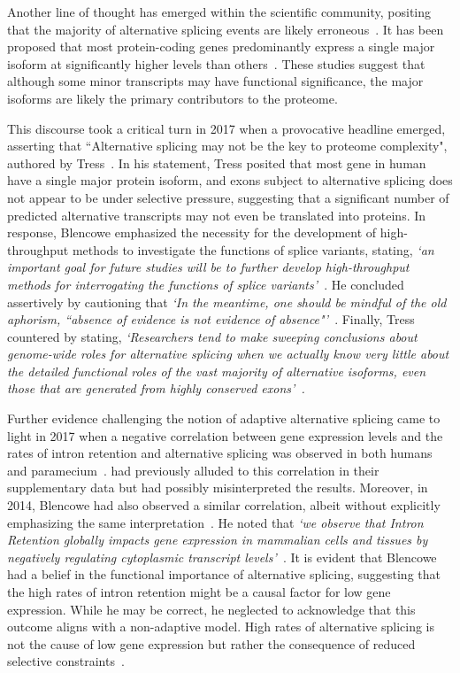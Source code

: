 Another line of thought has emerged within the scientific community, positing that the majority of alternative splicing events are likely erroneous~\citep{pickrell_noisy_2010, leoni_coding_2011}. It has been proposed that most protein-coding genes predominantly express a single major isoform at significantly higher levels than others~\citep{gonzalez-porta_transcriptome_2013, tress_most_2017}. These studies suggest that although some minor transcripts may have functional significance, the major isoforms are likely the primary contributors to the proteome.

This discourse took a critical turn in 2017 when a provocative headline emerged, asserting that “Alternative splicing may not be the key to proteome complexity", authored by Tress~\citep{tress_alternative_2017}. In his statement, Tress posited that most gene in human have a single major protein isoform, and exons subject to alternative splicing does not appear to be under selective pressure, suggesting that a significant number of predicted alternative transcripts may not even be translated into proteins. In response, Blencowe emphasized the necessity for the development of high-throughput methods to investigate the functions of splice variants, stating, \textit{`an important goal for future studies will be to further develop high-throughput methods for interrogating the functions of splice variants'~\citep{blencowe_relationship_2017}}. He concluded assertively by cautioning that \textit{`In the meantime, one should be mindful of the old aphorism, “absence of evidence is not evidence of absence"'~\citep{blencowe_relationship_2017}}. Finally, Tress countered by stating, \textit{`Researchers tend to make sweeping conclusions about genome-wide roles for alternative splicing when we actually know very little about the detailed functional roles of the vast majority of alternative isoforms, even those that are generated from highly conserved exons'~\citep{tress_most_2017}.}

Further evidence challenging the notion of adaptive alternative splicing came to light in 2017 when a negative correlation between gene expression levels and the rates of intron retention and alternative splicing was observed in both humans and paramecium~\citep{saudemont_fitness_2017}. \citet{chen_correcting_2014} had previously alluded to this correlation in their supplementary data but had possibly misinterpreted the results. Moreover, in 2014, Blencowe had also observed a similar correlation, albeit without explicitly emphasizing the same interpretation~\citep{braunschweig_widespread_2014}. He noted that \textit{`we observe that Intron Retention globally impacts gene expression in mammalian cells and tissues by negatively regulating cytoplasmic transcript levels'~\citep{braunschweig_widespread_2014}}. It is evident that Blencowe had a belief in the functional importance of alternative splicing, suggesting that the high rates of intron retention might be a causal factor for low gene expression. While he may be correct, he neglected to acknowledge that this outcome aligns with a non-adaptive model. High rates of alternative splicing is not the cause of low gene expression but rather the consequence of reduced selective constraints~\citep{melamud_stochastic_2009}.

